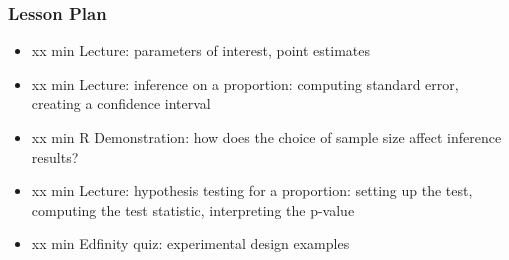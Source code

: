 \begin{frame}
    \frametitle{Lesson Plan}
    \begin{itemize}
        \item xx min Lecture: parameters of interest, point estimates
        \item xx min Lecture: inference on a proportion: computing standard error, creating a confidence interval
        \item xx min R Demonstration: how does the choice of sample size affect inference results?
        \item xx min Lecture: hypothesis testing for a proportion: setting up the test, computing the test statistic, interpreting the p-value
        \item xx min Edfinity quiz: experimental design examples
    \end{itemize}
\end{frame}
            
    
